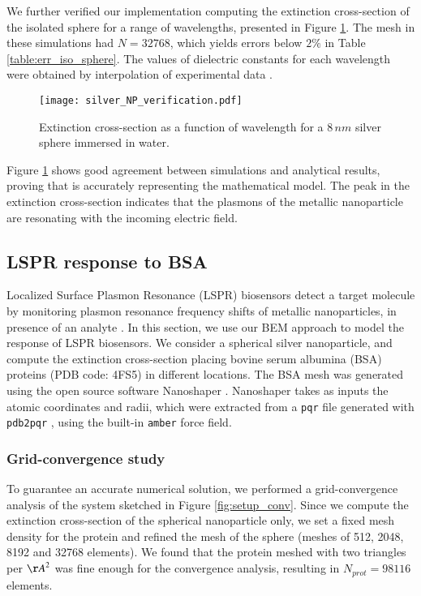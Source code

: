 We further verified our implementation computing the extinction cross-section of the 
isolated sphere for a range of wavelengths, presented in Figure \ref{fig:verif_sphere}. 
The mesh in these simulations had $N=32768$, which yields errors below $2\%$ in Table \ref{table:err_iso_sphere}.
The values of dielectric constants for each wavelength were obtained by interpolation of 
experimental data \cite{JohnsonChristy1972, HaleQuerry1972}.

\begin{figure}[h] %
   \centering
   \texttt{[image: silver\_NP\_verification.pdf]} 
   \caption{Extinction cross-section as a function of wavelength for a $8 \, nm$
            silver sphere immersed in water.}
   \label{fig:verif_sphere}
\end{figure}

Figure \ref{fig:verif_sphere} shows good agreement between simulations and analytical results, proving
that \pygbe is accurately representing the mathematical model. The 
peak in the extinction cross-section indicates that the plasmons of the metallic
nanoparticle are resonating with the incoming electric field.


\subsection{LSPR response to BSA} \label{sec:lspr_response}

Localized Surface Plasmon Resonance (LSPR) biosensors detect a target molecule by monitoring
plasmon resonance frequency shifts of metallic nanoparticles, in presence of an analyte \cite{WilletsVandyune2007}.
In this section, we use our BEM approach to model the response of LSPR biosensors.
We consider a spherical silver nanoparticle, and compute the extinction cross-section placing 
bovine serum albumina (BSA) proteins (PDB code: 4FS5) in different locations.
The BSA mesh was generated using the open source software Nanoshaper \cite{Nanoshaper}. 
Nanoshaper takes as inputs the atomic coordinates and radii, which were 
extracted from a \texttt{pqr} file generated with \texttt{pdb2pqr} \cite{Dolinsky04},
 using the built-in \texttt{amber} force field.

\subsubsection{Grid-convergence study} \label{sec:bsa_convergence}
To guarantee an accurate numerical solution, we performed a grid-convergence 
analysis of the system sketched in Figure \ref{fig:setup_conv}. 
Since we compute the extinction cross-section of the spherical nanoparticle only, we 
set a fixed mesh density for the protein and refined the mesh of the
sphere (meshes of 512, 2048, 8192 and 32768 elements). We found that the protein meshed with two
triangles per ${\AA}^2$ was fine enough for the convergence analysis, resulting in $N_{prot} = 98116$ elements. 


